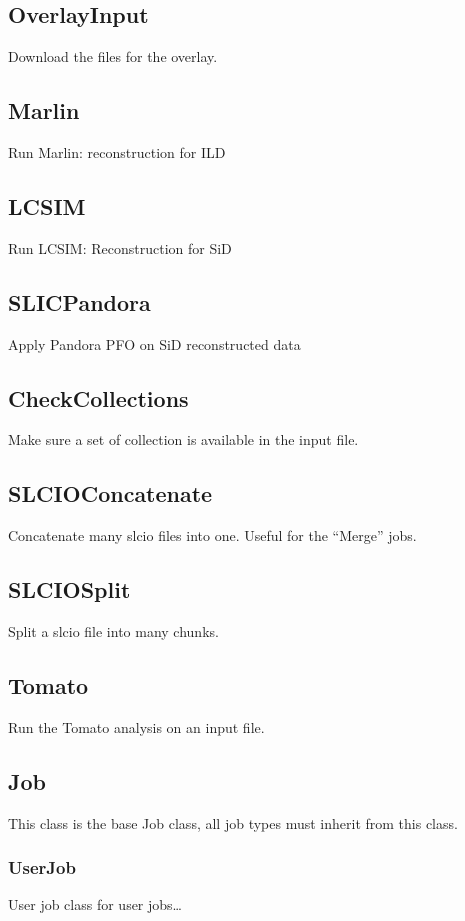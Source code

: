 \documentclass[a4paper,12pt]{article}
\begin{document}
\subsection{OverlayInput}\label{overlay}
Download the files for the overlay.

\subsection{Marlin}\label{marlin}
Run Marlin: reconstruction for ILD

\subsection{LCSIM}\label{lcsim}
Run LCSIM: Reconstruction for SiD

\subsection{SLICPandora}\label{slicpan}
Apply Pandora PFO on SiD reconstructed data

\subsection{CheckCollections}\label{checkcoll}
Make sure a set of collection is available in the input file.

\subsection{SLCIOConcatenate}\label{slcioconcat}
Concatenate many slcio files into one. Useful for the ``Merge'' jobs. 

\subsection{SLCIOSplit}\label{slciosplit}
Split a slcio file into many chunks. 

\subsection{Tomato}\label{tomato}
Run the Tomato analysis on an input file.

\subsection{Job}\label{job}
This class is the base Job class, all job types must inherit from this class.

\subsubsection{UserJob}\label{userjob}
User job class for user jobs\ldots
\end{document}
